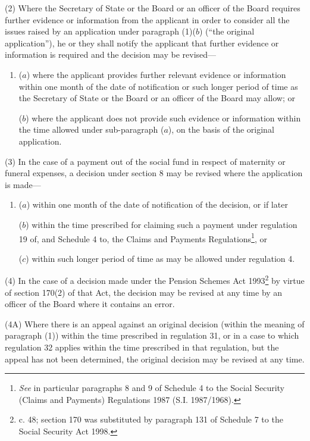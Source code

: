 \documentclass[12pt,a4paper]{article}
\begin{document}
(2) Where the Secretary of State 
or the Board or an officer of the Board  %
requires further evidence or information from the applicant in order to consider all the issues raised by an application under paragraph (1)($b$) (“the original application”), he 
or they  %
shall notify the applicant that further evidence or information is required and the decision may be revised—
\begin{enumerate}\item[]
($a$) where the applicant provides further relevant evidence or information within one month of the date of notification or such longer period of time as the Secretary of State 
or the Board or an officer of the Board  %
may allow; or

($b$) where the applicant does not provide such evidence or information within the time allowed under sub-paragraph ($a$), on the basis of the original application.
\end{enumerate}

(3) In the case of a payment out of the social fund in respect of maternity or funeral expenses, a decision under section 8 may be revised where the application is made—
\begin{enumerate}\item[]
($a$) within one month of the date of notification of the decision, or if later

($b$) within the time prescribed for claiming such a payment under regulation 19 of, and Schedule 4 to, the Claims and Payments Regulations\footnote{\frenchspacing \emph{See} in particular paragraphs 8 and 9 of Schedule 4 to the Social Security (Claims and Payments) Regulations 1987 (S.I. 1987/1968).}, or

($c$) within such longer period of time as may be allowed under regulation 4.
\end{enumerate}

(4) In the case of a decision made under the Pension Schemes Act 1993\footnote{ c. 48; section 170 was substituted by paragraph 131 of Schedule 7 to the Social Security Act 1998.} by virtue of section 170(2) of that Act, the decision may be revised at any time by 
an officer of the Board  %
where it contains an error.

(4A) Where there is an appeal against an original decision (within the meaning of paragraph (1)) within the time prescribed in regulation 31, or in a case to which regulation 32 applies within the time prescribed in that regulation, but the appeal has not been determined, the original decision may be revised at any time.
\end{document}
